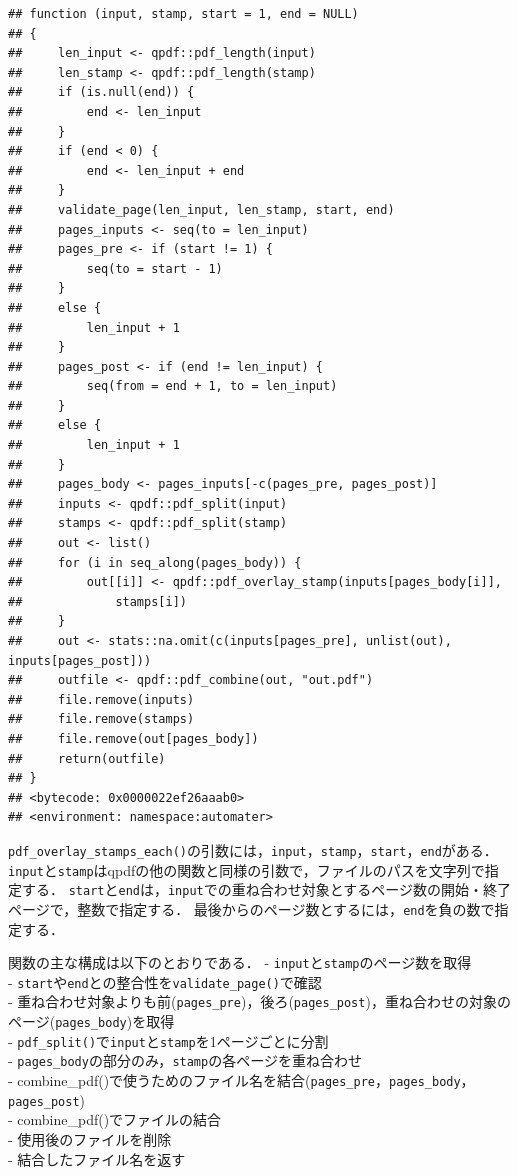 \documentclass[
]{article}
\begin{document}
\begin{verbatim}
## function (input, stamp, start = 1, end = NULL) 
## {
##     len_input <- qpdf::pdf_length(input)
##     len_stamp <- qpdf::pdf_length(stamp)
##     if (is.null(end)) {
##         end <- len_input
##     }
##     if (end < 0) {
##         end <- len_input + end
##     }
##     validate_page(len_input, len_stamp, start, end)
##     pages_inputs <- seq(to = len_input)
##     pages_pre <- if (start != 1) {
##         seq(to = start - 1)
##     }
##     else {
##         len_input + 1
##     }
##     pages_post <- if (end != len_input) {
##         seq(from = end + 1, to = len_input)
##     }
##     else {
##         len_input + 1
##     }
##     pages_body <- pages_inputs[-c(pages_pre, pages_post)]
##     inputs <- qpdf::pdf_split(input)
##     stamps <- qpdf::pdf_split(stamp)
##     out <- list()
##     for (i in seq_along(pages_body)) {
##         out[[i]] <- qpdf::pdf_overlay_stamp(inputs[pages_body[i]], 
##             stamps[i])
##     }
##     out <- stats::na.omit(c(inputs[pages_pre], unlist(out), inputs[pages_post]))
##     outfile <- qpdf::pdf_combine(out, "out.pdf")
##     file.remove(inputs)
##     file.remove(stamps)
##     file.remove(out[pages_body])
##     return(outfile)
## }
## <bytecode: 0x0000022ef26aaab0>
## <environment: namespace:automater>
\end{verbatim}

\texttt{pdf\_overlay\_stamps\_each()}の引数には，\texttt{input}，\texttt{stamp}，\texttt{start}，\texttt{end}がある．
\texttt{input}と\texttt{stamp}はqpdfの他の関数と同様の引数で，ファイルのパスを文字列で指定する．
\texttt{start}と\texttt{end}は，\texttt{input}での重ね合わせ対象とするページ数の開始・終了ページで，整数で指定する．
最後からのページ数とするには，\texttt{end}を負の数で指定する．

関数の主な構成は以下のとおりである．
- \texttt{input}と\texttt{stamp}のページ数を取得\\
- \texttt{start}や\texttt{end}との整合性を\texttt{validate\_page()}で確認\\
- 重ね合わせ対象よりも前(\texttt{pages\_pre})，後ろ(\texttt{pages\_post})，重ね合わせの対象のページ(\texttt{pages\_body})を取得\\
- \texttt{pdf\_split()}で\texttt{input}と\texttt{stamp}を1ページごとに分割\\
- \texttt{pages\_body}の部分のみ，\texttt{stamp}の各ページを重ね合わせ\\
- combine\_pdf()で使うためのファイル名を結合(\texttt{pages\_pre}，\texttt{pages\_body}，\texttt{pages\_post})\\
- combine\_pdf()でファイルの結合\\
- 使用後のファイルを削除\\
- 結合したファイル名を返す
\end{document}
